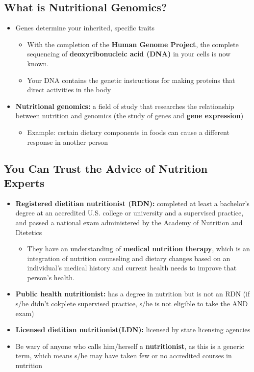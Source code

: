 \documentclass[12pt]{article}
\begin{document}
        \subsection{What is Nutritional Genomics?}
            \begin{itemize}
                \item Genes determine your inherited, specific traits
                    \begin{itemize}
                        \item With the completion of the \textbf{Human Genome Project}, the complete sequencing of \textbf{deoxyribonucleic acid (DNA)} in your cells is now known.
                        \item Your DNA contains the genetic instructions for making proteins that direct activities in the body
                    \end{itemize}
                \item \textbf{Nutritional genomics:} a field of study that researches the relationship between nutrition and genomics (the study of genes and \textbf{gene expression})
                    \begin{itemize}
                        \item Example: certain dietary components in foods can cause a different response in another person
                    \end{itemize}
            \end{itemize}

        \subsection{You Can Trust the Advice of Nutrition Experts}
            \begin{itemize}
                \item \textbf{Registered dietitian nutritionist (RDN):} completed at least a bachelor's degree at an accredited U.S. college or university and a supervised practice, and passed a national exam administered by the Academy of Nutrition and Dietetics
                    \begin{itemize}
                        \item They have an understanding of \textbf{medical nutrition therapy}, which is an integration of nutrition counseling and dietary changes based on an individual's medical history and current health needs to improve that person's health.
                    \end{itemize}
                \item \textbf{Public health nutritionist:} has a degree in nutrition but is not an RDN (if s/he didn't cokplete supervised practice, s/he is not eligible to take the AND exam)
                \item \textbf{Licensed dietitian nutritionist(LDN):} licensed by state licensing agencies
                \item Be wary of anyone who calls him/herself a \textbf{nutritionist}, as this is a generic term, which means s/he may have taken few or no accredited courses in nutrition
            \end{itemize}
\end{document}
